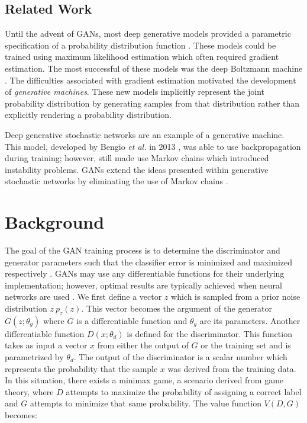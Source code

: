 \documentclass[11pt]{article}
\begin{document}
\subsection{Related Work}
Until the advent of GANs, most deep generative models provided a parametric specification of a probability distribution function \citep{2014arXiv1406.2661G}. These models could be trained using maximum likelihood estimation which often required gradient estimation. The most successful of these models was the deep Boltzmann machine \citep{2014arXiv1406.2661G}. The difficulties associated with gradient estimation motivated the development of \textit{generative machines}. These new models implicitly represent the joint probability distribution by generating samples from that distribution rather than explicitly rendering a probability distribution.

Deep generative stochastic networks are an example of a generative machine. This model, developed by Bengio \textit{et al.} in 2013 \citep{2013arXiv1306.1091B}, was able to use backpropagation during training; however, still made use Markov chains which introduced instability problems. GANs extend the ideas presented within generative stochastic networks by eliminating the use of Markov chains \citep{2014arXiv1406.2661G}.



\section{Background} \label{sec:background}
The goal of the GAN training process is to determine the discriminator and generator parameters such that the classifier error is minimized and maximized respectively \citep{2017arXiv171007035C}. GANs may use any differentiable functions for their underlying implementation; however, optimal results are typically achieved when neural networks are used \citep{2014arXiv1406.2661G}. We first define a vector $z$ which is sampled from a prior noise distribution $z~p_z(z)$. This vector becomes the argument of the generator $G(z;\theta_g)$ where $G$ is a differentiable function and $\theta_g$ are its parameters. Another differentiable function $D(x;\theta_d)$ is defined for the discriminator. This function takes as input a vector $x$ from either the output of $G$ or the training set and is parametrized by $\theta_d$. The output of the discriminator is a scalar number which represents the probability that the sample $x$ was derived from the training data. In this situation, there exists a minimax game, a scenario derived from game theory, where $D$ attempts to maximize the probability of assigning a correct label and $G$ attempts to minimize that same probability. The value function $V(D,G)$ becomes:
\end{document}
